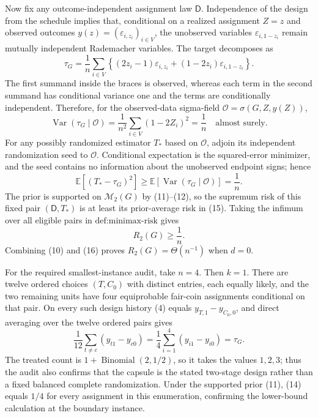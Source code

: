 Now fix any outcome-independent assignment law \(\mathsf D\).  Independence of the design from the schedule implies that, conditional on a realized assignment \(Z=z\) and observed outcomes \(y(z)=(\varepsilon_{i,z_i})_{i\in V}\), the unobserved variables \(\varepsilon_{i,1-z_i}\) remain mutually independent Rademacher variables.  The target decomposes as
\[
\tau_G
=\frac1n\sum_{i\in V}
\left\{(2z_i-1)\varepsilon_{i,z_i}
 +(1-2z_i)\varepsilon_{i,1-z_i}\right\}. \tag{13}
\]
The first summand inside the braces is observed, whereas each term in the second summand has conditional variance one and the terms are conditionally independent.  Therefore, for the observed-data sigma-field \(\mathscr O=\sigma(G,Z,y(Z))\),
\[
\operatorname{Var}(\tau_G\mid\mathscr O)
=\frac1{n^2}\sum_{i\in V}(1-2Z_i)^2
=\frac1n \quad\text{almost surely}. \tag{14}
\]
For any possibly randomized estimator \(T_*\) based on \(\mathscr O\), adjoin its independent randomization seed to \(\mathscr O\).  Conditional expectation is the squared-error minimizer, and the seed contains no information about the unobserved endpoint signs; hence
\[
\mathbb E[(T_*-\tau_G)^2]
\ge \mathbb E[\operatorname{Var}(\tau_G\mid\mathscr O)]
=\frac1n. \tag{15}
\]
The prior is supported on \(\mathcal M_2(G)\) by (11)--(12), so the supremum risk of this fixed pair \((\mathsf D,T_*)\) is at least its prior-average risk in (15).  Taking the infimum over all eligible pairs in \(\text{def:minimax-risk}\) gives
\[
R_2(G)\ge \frac1n. \tag{16}
\]
Combining (10) and (16) proves \(R_2(G)=\Theta(n^{-1})\) when \(d=0\).

For the required smallest-instance audit, take \(n=4\).  Then \(k=1\).  There are twelve ordered choices \((T,C_0)\) with distinct entries, each equally likely, and the two remaining units have four equiprobable fair-coin assignments conditional on that pair.  On every such design history (4) equals \(y_{T,1}-y_{C_0,0}\), and direct averaging over the twelve ordered pairs gives
\[
\frac1{12}\sum_{t\ne c}(y_{t1}-y_{c0})
=\frac14\sum_{i=1}^4(y_{i1}-y_{i0})
=\tau_G. \tag{17}
\]
The treated count is \(1+\operatorname{Binomial}(2,1/2)\), so it takes the values \(1,2,3\); thus the audit also confirms that the capsule is the stated two-stage design rather than a fixed balanced complete randomization.  Under the supported prior (11), (14) equals \(1/4\) for every assignment in this enumeration, confirming the lower-bound calculation at the boundary instance.
